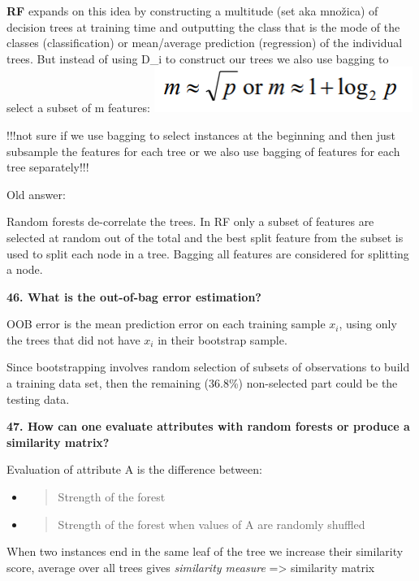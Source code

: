 \textbf{RF} expands on this idea by constructing a multitude (set aka
množica) of decision trees at training time and outputting the class
that is the mode of the classes (classification) or mean/average
prediction (regression) of the individual trees. But instead of using
D\_i to construct our trees we also use bagging to select a subset of m
features:
\includegraphics[width=3.32292in,height=0.58333in]{media/image20.png}

!!!not sure if we use bagging to select instances at the beginning and
then just subsample the features for each tree or we also use bagging of
features for each tree separately!!!

Old answer:

Random forests de-correlate the trees. In RF only a subset of features
are selected at random out of the total and the best split feature from
the subset is used to split each node in a tree. Bagging all features
are considered for splitting a node.

\textbf{46. What is the out-of-bag error estimation?}

OOB error is the mean prediction error on each training sample $x_i$, using
only the trees that did not have $x_i$ in their bootstrap sample.

Since bootstrapping involves random selection of subsets of observations
to build a training data set, then the remaining (36.8\%) non-selected
part could be the testing data.

\textbf{47. How can one evaluate attributes with random forests or
produce a similarity matrix?}

Evaluation of attribute A is the difference between:

\begin{itemize}
\item
  \begin{quote}
  Strength of the forest
  \end{quote}
\item
  \begin{quote}
  Strength of the forest when values of A are randomly shuffled
  \end{quote}
\end{itemize}

When two instances end in the same leaf of the tree we increase their
similarity score, average over all trees gives \emph{similarity measure}
=\textgreater{} similarity matrix

